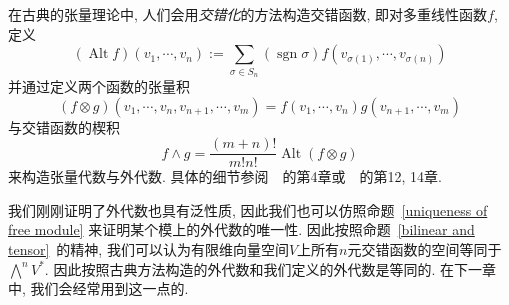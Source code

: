 \begin{rem}
    在古典的张量理论中, 人们会用\textit{交错化}的方法构造交错函数, 即对多重线性函数$f$, 定义
    \[(\operatorname{Alt}f)(v_1,\cdots,v_n):=\sum_{\sigma\in S_n}(\operatorname{sgn}{\sigma})f(v_{\sigma(1)},\cdots,v_{\sigma(n)})\]
    并通过定义两个函数的张量积
    \[(f\otimes g)(v_1,\cdots,v_n,v_{n+1},\cdots,v_m)=f(v_1,\cdots,v_n)g(v_{n+1},\cdots,v_m)\]
    与交错函数的楔积
    \[f\wedge g=\frac{(m+n)!}{m!n!}\operatorname{Alt}(f\otimes g)\]
    来构造张量代数与外代数.
    具体的细节参阅~\parencite{Spivak_CalMani}~的第4章或~\parencite{Lee_IntroSmMani}~的第12, 14章.

    我们刚刚证明了外代数也具有泛性质, 因此我们也可以仿照命题~\ref{uniqueness of free module} 来证明某个模上的外代数的唯一性.
    因此按照命题~\ref{bilinear and tensor}~的精神,
    我们可以认为有限维向量空间$V$上所有$n$元交错函数的空间等同于$\displaystyle\bigwedge\nolimits^n V^*$.
    因此按照古典方法构造的外代数和我们定义的外代数是等同的.
    在下一章中, 我们会经常用到这一点的.
\end{rem}
\blank